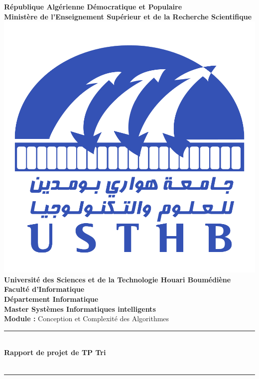 \documentclass[12pt]{report}
\newcommand{\HRule}{\rule{\linewidth}{0.5mm}}
\begin{document}
    \begin{titlepage}
        \begin{center}
            \textbf{République Algérienne Démocratique et Populaire}\\
            \textbf{Ministère de l'Enseignement Supérieur et de la Recherche Scientifique}\\[1cm]
            
            \includegraphics[scale=0.5]{ressources/USTHB_Logo.png}\\[1cm]
            
            \large
            \textbf{Université des Sciences et de la Technologie Houari Boumédiène}\\[0.5cm]
            \textbf{Faculté d'Informatique}\\
            \textbf{Département Informatique}\\[0.5cm]

            \Large
            \textbf{Master Systèmes Informatiques intelligents}\\[0.5cm]
            
            \textbf{Module :} Conception et Complexité des Algorithmes

            \HRule \\[0.4cm]
            \LARGE{\textbf{Rapport de projet de TP Tri}\\
            \textit{}\\[0.4cm]}
            \HRule \\[2cm]
            

\end{center}
\end{titlepage}
\end{document}
